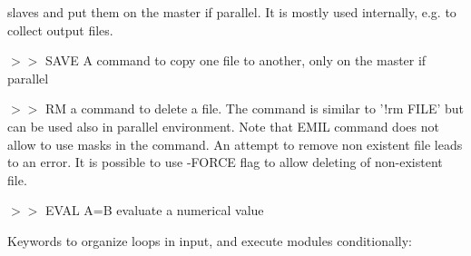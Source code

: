 \begin{commandlist}
slaves and put them on the master if parallel. It is mostly used internally, e.g.
to collect output files.
\item[$>>$ SAVE ] A command to copy one file to another, only on the master if parallel
\item[$>>$ RM ] a command to delete a file. The command is similar to '!rm
  FILE' but can be used also in parallel environment. Note that EMIL command
  does not allow to use masks in the command. An attempt to remove non existent
  file leads to an error. It is possible to use -FORCE flag to allow deleting
  of non-existent file.

\item[$>>$ EVAL A=B ] evaluate a numerical value
\end{commandlist}


Keywords to organize loops in input, and execute modules conditionally:

